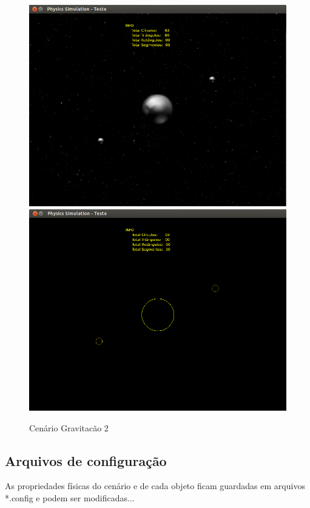   \begin{figure}[H]
	\centering
	\caption{Cenário Gravitacão 2}
    \includegraphics[scale=0.4]{images/cenario-gravitacao-4.png}
    \includegraphics[scale=0.4]{images/cenario-gravitacao-3.png}
  \end{figure}

\subsection{Arquivos de configuração}
As propriedades físicas do cenário e de cada objeto ficam guardadas em arquivos *.config e podem ser modificadas...

